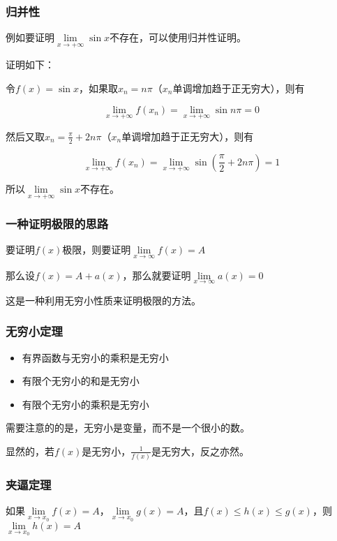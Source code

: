 \documentclass[12pt , a4paper , oneside]{ctexart}
\begin{document}
            \subsubsection{归并性}
            例如要证明$\lim\limits_{x \to + \infty} \sin x$不存在，可以使用归并性证明。

            证明如下：

            令$f(x)=\sin x$，如果取$x_n=n\pi$（$x_n$单调增加趋于正无穷大），则有

            $$\lim\limits_{x \to + \infty} f(x_n) = \lim\limits_{x \to + \infty} \sin n\pi = 0$$

            然后又取$x_n=\frac{\pi}{2}+2n\pi$（$x_n$单调增加趋于正无穷大），则有

            $$\lim\limits_{x \to + \infty} f(x_n) = \lim\limits_{x \to + \infty} \sin (\frac{\pi}{2}+2n\pi) = 1$$
            
            所以$\lim\limits_{x \to + \infty} \sin x$不存在。
            
            \subsubsection{一种证明极限的思路}
            要证明$f(x)$极限，则要证明$\lim\limits_{x \to \infty} f(x) =A$

            那么设$f(x)=A+a(x)$，那么就要证明$\lim\limits_{x \to \infty} a(x) = 0$

            这是一种利用无穷小性质来证明极限的方法。

            \subsubsection{无穷小定理}
            \begin{itemize}
                \item 有界函数与无穷小的乘积是无穷小
                \item 有限个无穷小的和是无穷小
                \item 有限个无穷小的乘积是无穷小
            \end{itemize}
            需要注意的的是，无穷小是变量，而不是一个很小的数。

            显然的，若$f(x)$是无穷小，$\frac{1}{f(x)}$是无穷大，反之亦然。

            \subsubsection{夹逼定理}
            如果$\lim\limits_{x \to x_0} f(x) = A$，$\lim\limits_{x \to x_0} g(x) = A$，且$f(x) \leq h(x) \leq g(x)$，则$\lim\limits_{x \to x_0} h(x) = A$
\end{document}
